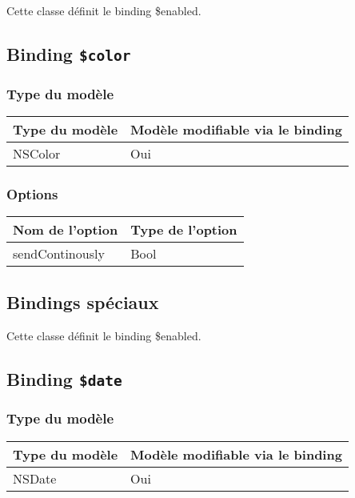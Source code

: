 Cette classe définit le binding \$enabled.

\subsection{Binding \texttt{\$color}}

\subsubsection{Type du modèle}

\begin{tabular}{|l|l|}
\hline
\textbf{Type du modèle} & \textbf{Modèle modifiable via le binding}\\
\hline
NSColor & Oui\\
\hline
\end{tabular}
\subsubsection{Options}

\begin{tabular}{|l|l|}
\hline
\textbf{Nom de l'option} & \textbf{Type de l'option}\\
\hline
sendContinously & Bool\\
\hline
\end{tabular}








\subsection{Bindings spéciaux}

Cette classe définit le binding \$enabled.

\subsection{Binding \texttt{\$date}}

\subsubsection{Type du modèle}

\begin{tabular}{|l|l|}
\hline
\textbf{Type du modèle} & \textbf{Modèle modifiable via le binding}\\
\hline
NSDate & Oui\\
\hline
\end{tabular}
